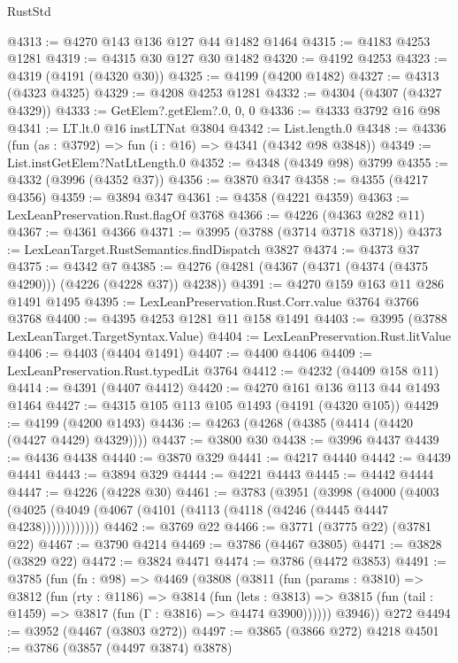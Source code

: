 \begin{lexlean}{RustStd}
\begin{coremodule}
@4313 := @4270 @143 @136 @127 @44 @1482 @1464
@4315 := @4183 @4253 @1281
@4319 := @4315 @30 @127 @30 @1482
@4320 := @4192 @4253
@4323 := @4319 (@4191 (@4320 @30))
@4325 := @4199 (@4200 @1482)
@4327 := @4313 (@4323 @4325)
@4329 := @4208 @4253 @1281
@4332 := @4304 (@4307 (@4327 @4329))
@4333 := GetElem?.getElem?.{0, 0, 0}
@4336 := @4333 @3792 @16 @98
@4341 := LT.lt.{0} @16 instLTNat @3804
@4342 := List.length.{0}
@4348 := @4336 (fun (as : @3792) => fun (i : @16) => @4341 (@4342 @98 @3848))
@4349 := List.instGetElem?NatLtLength.{0}
@4352 := @4348 (@4349 @98) @3799
@4355 := @4332 (@3996 (@4352 @37))
@4356 := @3870 @347
@4358 := @4355 (@4217 @4356)
@4359 := @3894 @347
@4361 := @4358 (@4221 @4359)
@4363 := LexLeanPreservation.Rust.flagOf @3768
@4366 := @4226 (@4363 @282 @11)
@4367 := @4361 @4366
@4371 := @3995 (@3788 (@3714 @3718 @3718))
@4373 := LexLeanTarget.RustSemantics.findDispatch @3827
@4374 := @4373 @37
@4375 := @4342 @7
@4385 := @4276 (@4281 (@4367 (@4371 (@4374 (@4375 @4290))) (@4226 (@4228 @37)) @4238))
@4391 := @4270 @159 @163 @11 @286 @1491 @1495
@4395 := LexLeanPreservation.Rust.Corr.value @3764 @3766 @3768
@4400 := @4395 @4253 @1281 @11 @158 @1491
@4403 := @3995 (@3788 LexLeanTarget.TargetSyntax.Value)
@4404 := LexLeanPreservation.Rust.litValue
@4406 := @4403 (@4404 @1491)
@4407 := @4400 @4406
@4409 := LexLeanPreservation.Rust.typedLit @3764
@4412 := @4232 (@4409 @158 @11)
@4414 := @4391 (@4407 @4412)
@4420 := @4270 @161 @136 @113 @44 @1493 @1464
@4427 := @4315 @105 @113 @105 @1493 (@4191 (@4320 @105))
@4429 := @4199 (@4200 @1493)
@4436 := @4263 (@4268 (@4385 (@4414 (@4420 (@4427 @4429) @4329))))
@4437 := @3800 @30
@4438 := @3996 @4437
@4439 := @4436 @4438
@4440 := @3870 @329
@4441 := @4217 @4440
@4442 := @4439 @4441
@4443 := @3894 @329
@4444 := @4221 @4443
@4445 := @4442 @4444
@4447 := @4226 (@4228 @30)
@4461 := @3783
    (@3951
      (@3998
        (@4000
          (@4003 (@4025 (@4049 (@4067 (@4101 (@4113 (@4118 (@4246 (@4445 @4447 @4238))))))))))))
@4462 := @3769 @22
@4466 := @3771 (@3775 @22) (@3781 @22)
@4467 := @3790 @4214
@4469 := @3786 (@4467 @3805)
@4471 := @3828 (@3829 @22)
@4472 := @3824 @4471
@4474 := @3786 (@4472 @3853)
@4491 := @3785
    (fun (fn : @98) =>
    @4469
      (@3808
        (@3811
          (fun (params : @3810) =>
          @3812
            (fun (rty : @1186) =>
            @3814
              (fun (lets : @3813) =>
              @3815 (fun (tail : @1459) => @3817 (fun (Γ : @3816) => @4474 @3900))))))
        @3946))
    @272
@4494 := @3952 (@4467 (@3803 @272))
@4497 := @3865 (@3866 @272) @4218
@4501 := @3786 (@3857 (@4497 @3874) @3878)

\end{coremodule}
\end{lexlean}
